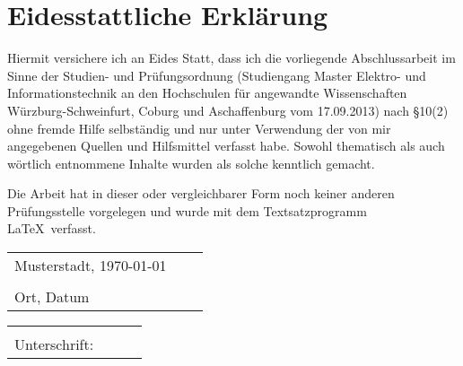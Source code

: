 
\ihead{}
\chead{}
\ohead{\pagemark}

\ifoot{}
\cfoot{}
\ofoot{}


\chapter*{Eidesstattliche Erklärung}

\thispagestyle{headings}



\vskip 10mm

Hiermit versichere ich an Eides Statt, dass ich die vorliegende Abschlussarbeit im Sinne der Studien- und Prüfungsordnung (Studiengang Master Elektro- und Informationstechnik an den Hochschulen für angewandte Wissenschaften Würzburg-Schweinfurt, Coburg und Aschaffenburg vom 17.09.2013) nach \S10(2) ohne fremde Hilfe selbständig und nur unter Verwendung der von mir angegebenen Quellen und Hilfsmittel verfasst habe. Sowohl thematisch als auch wörtlich entnommene Inhalte wurden als solche kenntlich gemacht. 

\vskip 10mm

Die Arbeit hat in dieser oder vergleichbarer Form noch keiner anderen Prüfungsstelle vorgelegen und wurde mit dem Textsatzprogramm \LaTeX~verfasst.

\vskip 30mm

\begin{tabular}{p{7cm}p{.5cm}l}
	Musterstadt, \today\\
	\dotfill\\
	Ort, Datum
\end{tabular}
\hfill
\begin{tabular}{p{7cm}p{.5cm}l}
	\\
	\dotfill\\
	Unterschrift: \authorFirstname~\authorLastname
\end{tabular}
